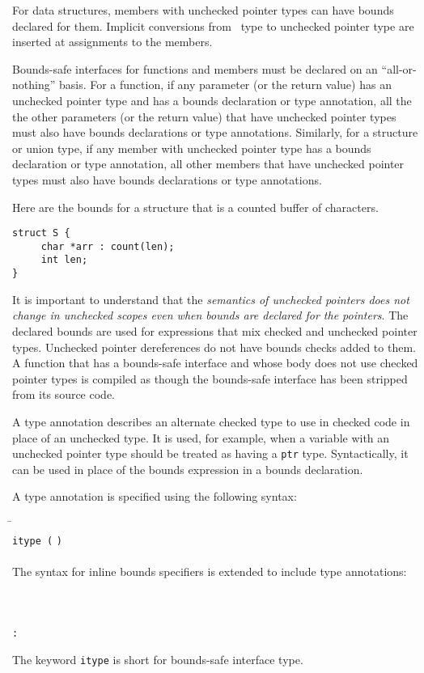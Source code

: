 For data structures, members with unchecked pointer types can
have bounds declared for them.   Implicit conversions from \arrayptr\ 
type to unchecked pointer type are inserted at assignments to the members.

Bounds-safe interfaces for functions and members must be
declared on an ``all-or-nothing'' basis.
For a function, if any parameter (or the return value) has an unchecked pointer
type and has a bounds declaration or type annotation, all the
the other parameters (or the return value) that have unchecked
pointer types must also have bounds declarations or type
annotations.  Similarly, for a structure or union type,
if any member with unchecked pointer type
has a bounds declaration or type annotation, all other members
that have unchecked pointer types must also have bounds declarations
or type annotations.

Here are the bounds for a structure that is a counted buffer of
characters.
\begin{verbatim}
struct S {
     char *arr : count(len);
     int len;
}
\end{verbatim}

It is important to understand that the \emph{semantics of unchecked
pointers does not change in unchecked scopes even when bounds are
declared for the pointers}. The declared bounds are used  for expressions
that mix checked and unchecked pointer types. Unchecked pointer dereferences do not
have bounds checks added to them. A function that has a bounds-safe
interface and whose body does not use checked pointer
types is compiled as though the bounds-safe interface has been
stripped from its source code.

A type annotation describes an alternate checked type to use in checked code
in place of an unchecked type. It is used, for example, when a variable with
an unchecked pointer type should be treated as having
a \texttt{ptr} type.  Syntactically, it can
be used in place of the  bounds expression in a bounds declaration.

A type annotation is specified using the following syntax:

\begin{tabbing}
\= \\
\>\texttt{itype (}  \texttt{)}\\
\\
The syntax for inline bounds specifiers is extended to include
type annotations:\\
\\
\\
\> \var{\ldots{}}\\
\>\texttt{:} 
\end{tabbing}
The keyword \texttt{itype} is short for bounds-safe  interface type.

